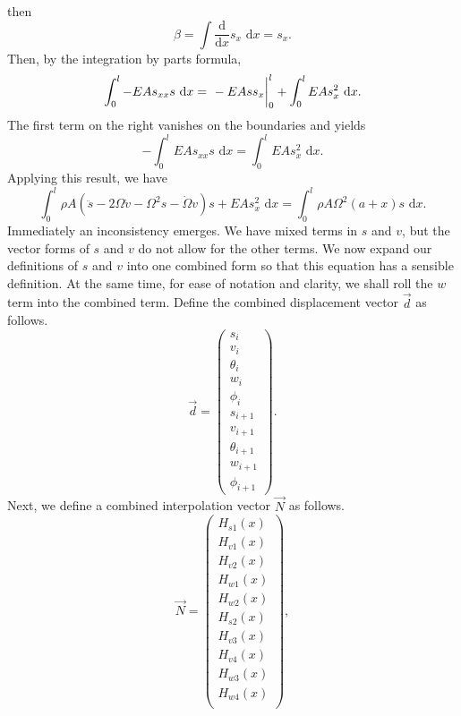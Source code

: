 then
\begin{equation}
\beta = \int \frac{\text{d}}{\text{d}x}s_x\text{ d}x = s_x.
\end{equation}
Then, by the integration by parts formula,
\begin{equation}
\int_0^l -EAs_{xx}s\text{ d}x = \left.\vphantom{\int}-EAss_x\right|_0^l+\int_0^l EAs_x^2\text{ d}x.
\label{eq:s.disc.int.by.parts}
\end{equation}
The first term on the right vanishes on the boundaries and yields
\begin{equation}
-\int_0^l EAs_{xx}s\text{ d}x = \int_0^l EAs_x^2\text{ d}x.
\end{equation}
Applying this result, we have
\begin{equation}
\int_0^l \rho A(\ddot s-2\Omega\dot v-\Omega^2s-\dot\Omega v)s+EAs_x^2 \text{ d}x = \int_0^l \rho A\Omega^2(a+x)s\text{ d}x.
\label{eq:s_displacement_integral_nonsense}
\end{equation}
Immediately an inconsistency emerges. We have mixed terms in $s$ and $v$, but the vector forms of $s$ and $v$ do not allow for the other terms. We now expand our definitions of $s$ and $v$ into one combined form so that this equation has a sensible definition. At the same time, for ease of notation and clarity, we shall roll the $w$ term into the combined term. Define the combined displacement vector $\vec d$ as follows.
\begin{equation}
\vec d = 
\begin{pmatrix}
s_i \\ 
v_i \\ 
\theta_i \\
w_i \\
\phi_i \\
s_{i+1} \\
v_{i+1} \\
\theta_{i+1} \\
w_{i+1} \\
\phi_{i+1}
\end{pmatrix}.
\end{equation}
Next, we define a combined interpolation vector $\vec{N}$ as follows.
\begin{equation}
\vec{N} = 
\begin{pmatrix}
H_{s1}(x) \\
H_{v1}(x) \\
H_{v2}(x) \\
H_{w1}(x) \\
H_{w2}(x) \\
H_{s2}(x) \\
H_{v3}(x) \\
H_{v4}(x) \\
H_{w3}(x) \\
H_{w4}(x) \\
\end{pmatrix},
\end{equation}
